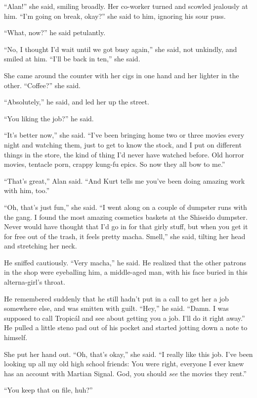 ``Alan!'' she said, smiling broadly.  Her co-worker turned and scowled
jealously at him.  ``I'm going on break, okay?'' she said to him,
ignoring his sour puss.

``What, now?'' he said petulantly.

``No, I thought I'd wait until we got busy again,'' she said, not
unkindly, and smiled at him.  ``I'll be back in ten,'' she said.

She came around the counter with her cigs in one hand and her lighter
in the other.  ``Coffee?'' she said.

``Absolutely,'' he said, and led her up the street.

``You liking the job?'' he said.

``It's better now,'' she said.  ``I've been bringing home two or three
movies every night and watching them, just to get to know the stock,
and I put on different things in the store, the kind of thing I'd
never have watched before.  Old horror movies, tentacle porn, crappy
kung-fu epics.  So now they all bow to me.''

``That's great,'' Alan said.  ``And Kurt tells me you've been doing
amazing work with him, too.''

``Oh, that's just fun,'' she said.  ``I went along on a couple of
dumpster runs with the gang.  I found the most amazing cosmetics
baskets at the Shiseido dumpster.  Never would have thought that I'd
go in for that girly stuff, but when you get it for free out of the
trash, it feels pretty macha.  Smell,'' she said, tilting her head and
stretching her neck.

He sniffed cautiously.  ``Very macha,'' he said.  He realized that the
other patrons in the shop were eyeballing him, a middle-aged man, with
his face buried in this alterna-girl's throat.

He remembered suddenly that he still hadn't put in a call to get her a
job somewhere else, and was smitten with guilt.  ``Hey,'' he said. 
``Damn.  I was supposed to call Tropic\'{a}l and see about getting you
a job.  I'll do it right away.'' He pulled a little steno pad out of
his pocket and started jotting down a note to himself.

She put her hand out.  ``Oh, that's okay,'' she said.  ``I really like
this job.  I've been looking up all my old high school friends:  You
were right, everyone I ever knew has an account with Martian Signal. 
God, you should \textit{see} the movies they rent.''

``You keep that on file, huh?''

